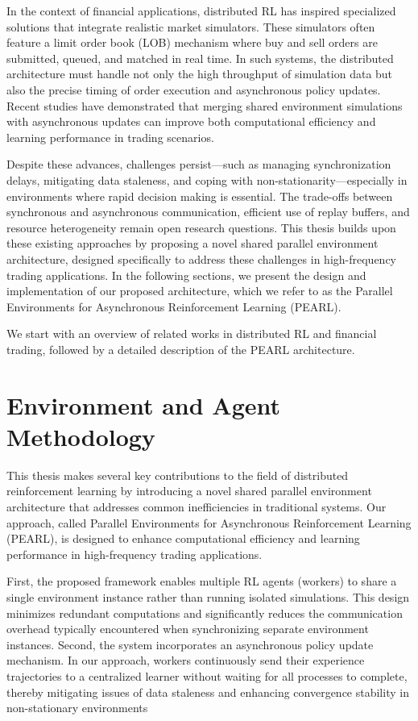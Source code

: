 In the context of financial applications, distributed RL has inspired specialized solutions that integrate realistic market simulators.
These simulators often feature a limit order book (LOB) mechanism where buy and sell orders are submitted, queued, and matched in real time.
In such systems, the distributed architecture must handle not only the high throughput of simulation data but also the
precise timing of order execution and asynchronous policy updates.
Recent studies have demonstrated that merging shared environment simulations with asynchronous updates can improve both
computational efficiency and learning performance in trading scenarios.

Despite these advances, challenges persist—such as managing synchronization delays, mitigating data staleness,
and coping with non-stationarity—especially in environments where rapid decision making is essential.
The trade-offs between synchronous and asynchronous communication, efficient use of replay buffers, and resource heterogeneity remain open research questions.
This thesis builds upon these existing approaches by proposing a novel shared parallel environment architecture,
designed specifically to address these challenges in high-frequency trading applications.
In the following sections, we present the design and implementation of our proposed architecture,
which we refer to as the Parallel Environments for Asynchronous Reinforcement Learning (PEARL).

We start with an overview of related works in distributed RL and financial trading, followed by a detailed description of the PEARL architecture.



\section{Environment and Agent Methodology}
\label{sec:methodology}

This thesis makes several key contributions to the field of distributed reinforcement learning by introducing a novel shared
parallel environment architecture that addresses common inefficiencies in traditional systems.
Our approach, called Parallel Environments for Asynchronous Reinforcement Learning (PEARL),
is designed to enhance computational efficiency and learning performance in high-frequency trading applications.

First, the proposed framework enables multiple RL agents (workers) to share a single environment instance rather than running isolated simulations.
This design minimizes redundant computations and significantly reduces the communication overhead typically
encountered when synchronizing separate environment instances.
Second, the system incorporates an asynchronous policy update mechanism.
In our approach, workers continuously send their experience trajectories to a centralized learner without waiting for all processes to complete,
thereby mitigating issues of data staleness and enhancing convergence stability in non-stationary environments

